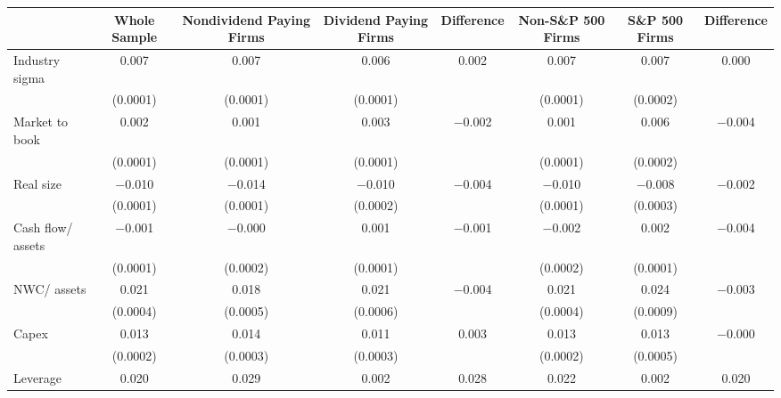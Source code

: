 \begin{tabular}{l*{7}{c}}
\toprule
                    &\multicolumn{1}{p{2cm}}{\centering Whole Sample}&\multicolumn{1}{p{2cm}}{\centering Nondividend Paying Firms}&\multicolumn{1}{p{2cm}}{\centering Dividend Paying Firms}&\multicolumn{1}{p{2cm}}{\centering Difference}&\multicolumn{1}{p{2cm}}{\centering Non-S\&P 500 Firms}&\multicolumn{1}{p{2cm}}{\centering S\&P 500 Firms}&\multicolumn{1}{p{2cm}}{\centering Difference}\\
\midrule
Industry sigma      &       0.007&       0.007&       0.006&       0.002&       0.007&       0.007&       0.000\\
                    &    (0.0001)&    (0.0001)&    (0.0001)&            &    (0.0001)&    (0.0002)&            \\
\addlinespace
Market to book      &       0.002&       0.001&       0.003&    $-$0.002&       0.001&       0.006&    $-$0.004\\
                    &    (0.0001)&    (0.0001)&    (0.0001)&            &    (0.0001)&    (0.0002)&            \\
\addlinespace
Real size           &    $-$0.010&    $-$0.014&    $-$0.010&    $-$0.004&    $-$0.010&    $-$0.008&    $-$0.002\\
                    &    (0.0001)&    (0.0001)&    (0.0002)&            &    (0.0001)&    (0.0003)&            \\
\addlinespace
Cash flow/ assets   &    $-$0.001&    $-$0.000&       0.001&    $-$0.001&    $-$0.002&       0.002&    $-$0.004\\
                    &    (0.0001)&    (0.0002)&    (0.0001)&            &    (0.0002)&    (0.0001)&            \\
\addlinespace
NWC/ assets         &       0.021&       0.018&       0.021&    $-$0.004&       0.021&       0.024&    $-$0.003\\
                    &    (0.0004)&    (0.0005)&    (0.0006)&            &    (0.0004)&    (0.0009)&            \\
\addlinespace
Capex               &       0.013&       0.014&       0.011&       0.003&       0.013&       0.013&    $-$0.000\\
                    &    (0.0002)&    (0.0003)&    (0.0003)&            &    (0.0002)&    (0.0005)&            \\
\addlinespace
Leverage            &       0.020&       0.029&       0.002&       0.028&       0.022&       0.002&       0.020\\

\end{tabular}
